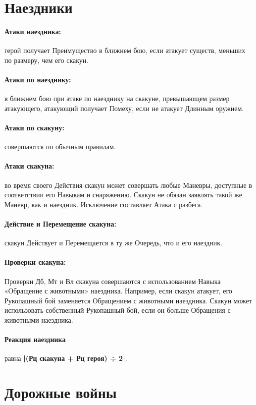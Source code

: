 \section{Наездники}
\paragraph{Атаки наездника:} герой получает Преимущество в ближнем бою, если атакует существ, меньших по размеру, чем его скакун.
\paragraph{Атаки по наезднику:} в ближнем бою при атаке по наезднику на скакуне, превышающем размер атакующего, атакующий получает Помеху, если не атакует Длинным оружием.
\paragraph{Атаки по скакуну:} совершаются по обычным правилам.
\paragraph{Атаки скакуна:} во время своего Действия скакун может совершать любые Маневры, доступные в соответствии его Навыкам и снаряжению. Скакун не обязан заявлять такой же Маневр, как и наездник. Исключение составляет Атака с разбега.
\paragraph{Действие и Перемещение скакуна:} скакун Действует и Перемещается в ту же Очередь, что и его наездник.
\paragraph{Проверки скакуна:} Проверки Дб, Мт и Вл скакуна совершаются с использованием Навыка «Обращение с животными» наездника.
\newline
Например, если скакун атакует, его Рукопашный бой заменяется Обращением с животными наездника. Скакун может использовать собственный Рукопашный бой, если он больше Обращения с животными наездника.
\paragraph{Реакция наездника} равна \textbf{|(Рц скакуна + Рц героя) ÷ 2|}.

\section{Дорожные войны}
